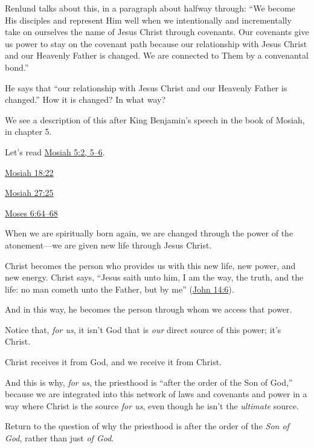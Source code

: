 \begin{compactitem}
				\begin{compactitem}
					\item Renlund talks about this, in a paragraph about halfway through: ``We become His disciples and represent Him well when we intentionally and incrementally take on ourselves the name of Jesus Christ through covenants. Our covenants give us power to stay on the covenant path because our relationship with Jesus Christ and our Heavenly Father is changed. We are connected to Them by a convenantal bond.''
					\item He says that ``our relationship with Jesus Christ and our Heavenly Father is changed.'' How it is changed? In what way?
					\item We see a description of this after King Benjamin's speech in the book of Mosiah, in chapter 5.
					\item Let's read \hyperref[MOSIAH-5-2]{Mosiah 5:2, 5--6}.
					\item \hyperref[MOSIAH-18-22]{Mosiah 18:22}
					\item \hyperref[MOSIAH-27-25]{Mosiah 27:25}
					\item \hyperref[MOSES-6-64]{Moses 6:64--68}
					\item When we are spiritually born again, we are changed through the power of the atonement---we are given new life through Jesus Christ.
					\item Christ becomes the person who provides us with this new life, new power, and new energy. Christ says, ``Jesus saith unto him, I am the way, the truth, and the life: no man cometh unto the Father, but by me'' (\hyperref[JOHN-14-6]{John 14:6}).
					\item And in this way, he becomes the person through whom we access that power.
					\item Notice that, \textit{for us}, it isn't God that is \textit{our} direct source of this power; it's Christ.
					\item Christ receives it from God, and we receive it from Christ.
					\item And this is why, \textit{for us}, the priesthood is ``after the order of the Son of God,'' because we are integrated into this network of laws and covenants and power in a way where Christ is the source \textit{for us}, even though he isn't the \textit{ultimate} source.
				\end{compactitem}
			\item Return to the question of why the priesthood is after the order of the \textit{Son of God}, rather than just \textit{of God}.
		\end{compactitem}
			
